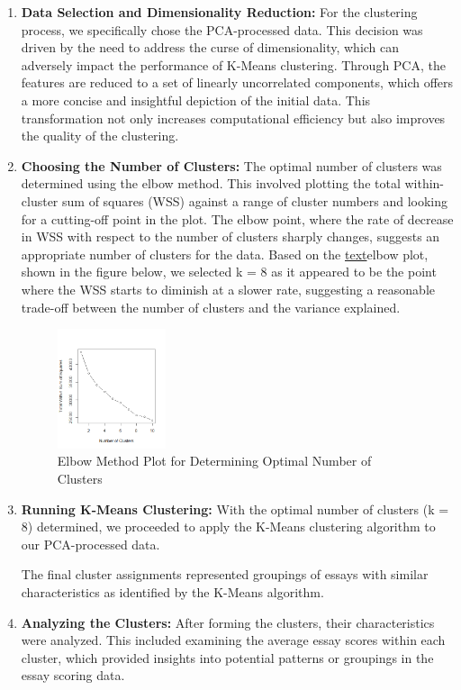 \documentclass[8pt]{report}
\begin{document}
\begin{enumerate}
    \item \textbf{Data Selection and Dimensionality Reduction:} For the clustering process, we specifically chose the PCA-processed data. This decision was driven by the need to address the curse of dimensionality, which can adversely impact the performance of K-Means clustering. Through PCA, the features are reduced to a set of linearly uncorrelated components, which offers a more concise and insightful depiction of the initial data. This transformation not only increases computational efficiency but also improves the quality of the clustering. 
    
    \item \textbf{Choosing the Number of Clusters:} The optimal number of clusters was determined using the elbow method. This involved plotting the total within-cluster sum of squares (WSS) against a range of cluster numbers and looking for a cutting-off point in the plot. The elbow point, where the rate of decrease in WSS with respect to the number of clusters sharply changes, suggests an appropriate number of clusters for the data. Based on the \hyperref[fig:silhouette_analysis]{text}elbow plot, shown in the figure below, we selected k = 8 as it appeared to be the point where the WSS starts to diminish at a slower rate, suggesting a reasonable trade-off between the number of clusters and the variance explained.

\begin{figure}[H]
    \centering
    \includegraphics[width=0.3\textwidth]{unsupervised_figures/elbow_method_pca.png}
    \caption{Elbow Method Plot for Determining Optimal Number of Clusters}
    \label{fig:elbow_plot}
\end{figure}
    \item \textbf{Running K-Means Clustering:} With the optimal number of clusters (k = 8) determined, we proceeded to apply the K-Means clustering algorithm to our PCA-processed data. 

The final cluster assignments represented groupings of essays with similar characteristics as identified by the K-Means algorithm. 
    
    \item \textbf{Analyzing the Clusters:} After forming the clusters, their characteristics were analyzed. This included examining the average essay scores within each cluster, which provided insights into potential patterns or groupings in the essay scoring data.
\end{enumerate}
\end{document}
